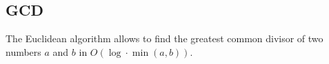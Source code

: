 \subsection{GCD}

The Euclidean algorithm allows to find the greatest common divisor of two numbers $a$ and $b$ in $O(\log \cdot \min(a, b))$.
